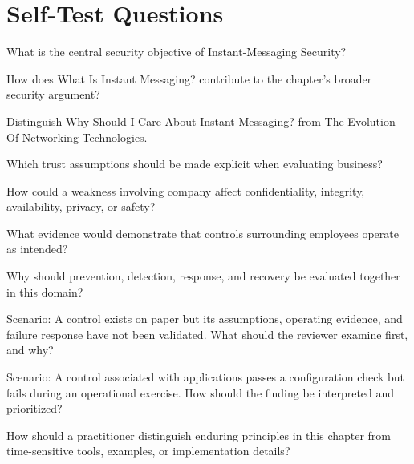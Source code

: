 \documentclass[11pt,letterpaper]{article}
\begin{document}
\section*{Self-Test Questions}
\begin{CornellRecallList}
\item What is the central security objective of Instant-Messaging Security?
\item How does What Is Instant Messaging? contribute to the chapter's broader security argument?
\item Distinguish Why Should I Care About Instant Messaging? from The Evolution Of Networking Technologies.
\item Which trust assumptions should be made explicit when evaluating business?
\item How could a weakness involving company affect confidentiality, integrity, availability, privacy, or safety?
\item What evidence would demonstrate that controls surrounding employees operate as intended?
\item Why should prevention, detection, response, and recovery be evaluated together in this domain?
\item Scenario: A control exists on paper but its assumptions, operating evidence, and failure response have not been validated. What should the reviewer examine first, and why?
\item Scenario: A control associated with applications passes a configuration check but fails during an operational exercise. How should the finding be interpreted and prioritized?
\item How should a practitioner distinguish enduring principles in this chapter from time-sensitive tools, examples, or implementation details?
\end{CornellRecallList}
\end{document}
